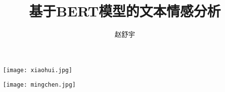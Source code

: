 
\title{基于BERT模型的文本情感分析} %
\author{赵舒宇} %


\begin{flushleft}
\hspace{8.5mm}\texttt{[image: xiaohui.jpg]} %
\end{flushleft}
\begin{center} %
\texttt{[image: mingchen.jpg]} %
\end{center}
\vspace{6.5mm}
\begin{center}
{\heiti \bfseries {}}
\end{center}
\vspace{20mm}
\begin{center}
\makeatletter
{\heiti \erhao {\textbf{\@title}}}
\makeatother
\end{center}
\vspace{28mm}
\begin{center}
\makeatletter
{\sanhao {}}\\\vspace{2.4mm}
{\sanhao {}}\\\vspace{2.4mm}
{\sanhao {}}\\\vspace{2.4mm}
{\sanhao {}}\\\vspace{2.4mm}
{\sanhao {}}\\\vspace{2.4mm}
{\sanhao {}}\\\vspace{2.4mm}
{\sanhao {}}
\makeatother
\end{center}
\vfill
\begin{center}
\makeatletter
\sanhao \heiti {\CJK@today}
\makeatother
\end{center}

